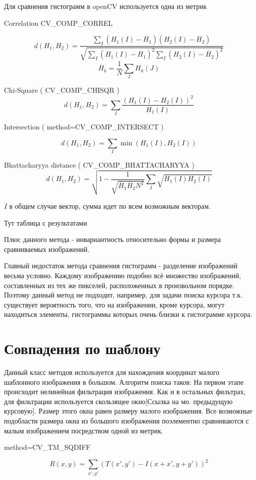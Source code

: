 \documentclass[oneside,final,14pt]{extreport}
\begin{document}
Для сравнения гистограмм в openCV используется одна из метрик

Correlation  CV\_COMP\_CORREL
 
$$
d(H_1,H_2) 
= 
\frac{
\sum_I(H_1(I) - \overline{H}_1)
(H_2(I)-\overline{H}_2)
}{
	\sqrt{
		\sum_I(H_1(I) - \overline{H}_1)^2
		\sum_I(H_2(I) - \overline{H}_2)^2
	}
}
$$
$$
\overline{H}_k 
= 
\frac{1}{N}
\sum_J H_k(J)
$$

Chi-Square ( CV\_COMP\_CHISQR )
$$
d(H_1,H_2)
=
\sum_I \frac{
	(H_1(I) - H_2(I))^2}
{H_1(I)}
$$

Intersection ( method=CV\_COMP\_INTERSECT )

$$
d(H_1,H_2)
=
\sum_I 
\min (H_1(I),H_2(I))
$$

Bhattacharyya distance ( CV\_COMP\_BHATTACHARYYA )
$$
d(H_1,H_2)
=
\sqrt{ 1 - 
\frac{1}{
  \sqrt{\overline{H}_1 
  		\overline{H}_2
  		N^2}
  }
  \sum_I
  \sqrt{H_1(I) H_2(I)}
}
$$

$I$ в общем случае вектор, сумма идет по всем возможным векторам.


Тут таблица с результатами

Плюс данного метода - инвариантность относительно формы и размера сравниваемых изображений.

Главный недостаток метода сравнения гистограмм -   разделение изображений весьма условно. Каждому изображению подобно всё множество изображений, составленных из тех же пикселей, расположенных в произвольном порядке. Поэтому данный метод не подходит, например,  для задачи поиска курсора т.к. существует вероятность того, что на изображении, кроме курсора, могут находиться элементы, гистограммы которых очень близки к гистограмме курсора.   

\section{Совпадения по шаблону}
Данный класс методов используется для нахождения координат малого шаблонного изображения в большом. Алгоритм поиска таков:
На первом этапе происходит нелинейная фильтрация изображения. Как и в остальных фильтрах, для фильтрации используется скользящее окно[Ссылка на мо. предыдущую курсовую]. Размер этого окна равен размеру малого изображения. Все возможные подобласти размера окна  из большого изображения поэлементно сравниваются с малым изображением посредством одной из метрик.   

 method=CV\_TM\_SQDIFF

$$
R(x,y)
=
\sum_{x',y'}
(T(x',y')-I(x+x',y+y'))^2
$$ 
\end{document}
